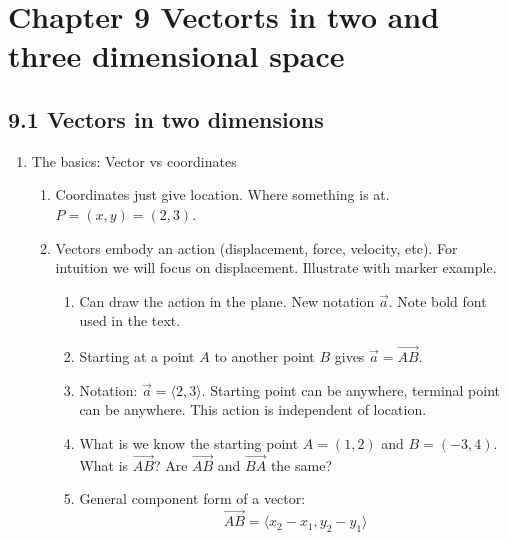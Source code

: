 \documentclass{article}
\begin{document}
\section{Chapter 9 Vectorts in two and three dimensional space}


\subsection{9.1 Vectors in two dimensions}
\begin{enumerate}

\item The basics: Vector vs coordinates
\begin{enumerate}
\item Coordinates just give location. Where something is at. $P = (x,y)=(2,3)$.
\item Vectors embody an action (displacement, force, velocity, etc). For intuition we will focus on displacement. Illustrate with marker example.
\begin{enumerate}
\item Can draw the action in the plane. New notation $\vec{a}$. Note bold font used in the text.
\item Starting at a point $A$ to another point $B$ gives $\vec{a} = \vec{AB}$.
\item Notation: $\vec{a} = \langle 2,3 \rangle$. Starting point can be anywhere, terminal point can be anywhere. This action is independent of location.
\item What is we know the starting point $A=(1,2)$ and $B=(-3,4)$. What is $\vec{AB}$? Are $\vec {AB}$ and $\vec {BA}$ the same? 
\item General component form of a vector:
\[
\vec{AB} = \langle x_2-x_1 , y_2-y_1 \rangle
\]
\end{enumerate}
\end{enumerate}


\end{enumerate}
\end{document}
